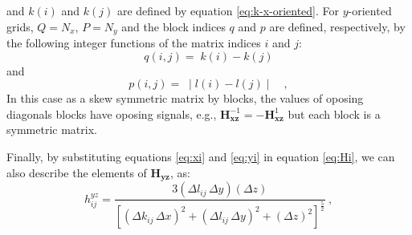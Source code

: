 and $k(i)$ and $k(j)$ are defined by equation \ref{eq:k-x-oriented}.
For $y$-oriented grids, $Q = N_{x}$, $P = N_{y}$ and the block indices
$q$ and $p$ are defined, respectively, by the following integer functions 
of the matrix indices $i$ and $j$:
\begin{equation}
q(i, j) = \;  k(i) - k(j)  
\label{eq:Hxz-q-y-oriented}
\end{equation}
and
\begin{equation}
p(i, j) = \; \mid l(i) - l(j) \mid \quad ,
\label{eq:Hxz-p-y-oriented}
\end{equation}
In this case as a skew symmetric matrix by blocks, the values of oposing diagonals blocks have oposing signals, e.g., $\mathbf{H}^{-1}_\mathbf{xz} = -\mathbf{H}^{1}_\mathbf{xz}$ but each block is a symmetric matrix.


Finally, by substituting equations \ref{eq:xi} and \ref{eq:yi} in equation \ref{eq:Hi}, we can also describe the elements of $\mathbf{H_{yz}}$, as:
\begin{equation}
h^{yz}_{ij} = \frac{3 (\Delta l_{ij} \, \Delta y )(\Delta z)}{\left[ 
	\left( \Delta k_{ij} \, \Delta x \right)^{2} + 
	\left( \Delta l_{ij} \, \Delta y \right)^{2} + 
	\left( \Delta z \right)^{2} \right]^{\frac{5}{2}}} \: ,
\label{eq:hyz_mag}
\end{equation}

